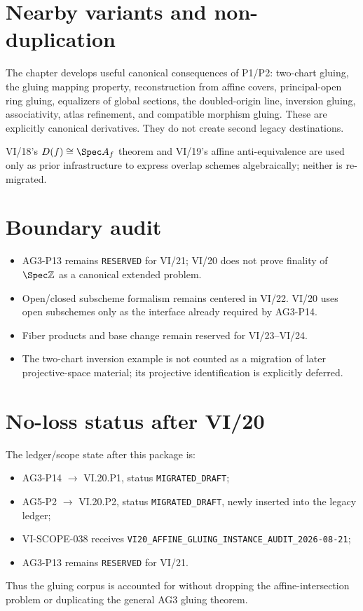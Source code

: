 \section*{Nearby variants and non-duplication}
The chapter develops useful canonical consequences of P1/P2: two-chart gluing, the gluing mapping
property, reconstruction from affine covers, principal-open ring gluing, equalizers of global sections,
the doubled-origin line, inversion gluing, associativity, atlas refinement, and compatible morphism
gluing.  These are explicitly canonical derivatives.  They do not create second legacy destinations.

VI/18's $D(f)\cong\Spec A_f$ theorem and VI/19's affine anti-equivalence are used only as prior
infrastructure to express overlap schemes algebraically; neither is re-migrated.

\section*{Boundary audit}
\begin{itemize}
\item AG3-P13 remains \texttt{RESERVED} for VI/21; VI/20 does not prove finality of $\Spec\mathbb Z$ as a canonical extended problem.
\item Open/closed subscheme formalism remains centered in VI/22.  VI/20 uses open subschemes only as the interface already required by AG3-P14.
\item Fiber products and base change remain reserved for VI/23--VI/24.
\item The two-chart inversion example is not counted as a migration of later projective-space material; its projective identification is explicitly deferred.
\end{itemize}

\section*{No-loss status after VI/20}
The ledger/scope state after this package is:
\begin{itemize}
\item AG3-P14 $\to$ VI.20.P1, status \texttt{MIGRATED\_DRAFT};
\item AG5-P2 $\to$ VI.20.P2, status \texttt{MIGRATED\_DRAFT}, newly inserted into the legacy ledger;
\item VI-SCOPE-038 receives \texttt{VI20\_AFFINE\_GLUING\_INSTANCE\_AUDIT\_2026-08-21};
\item AG3-P13 remains \texttt{RESERVED} for VI/21.
\end{itemize}
Thus the gluing corpus is accounted for without dropping the affine-intersection problem or duplicating the general AG3 gluing theorem.
